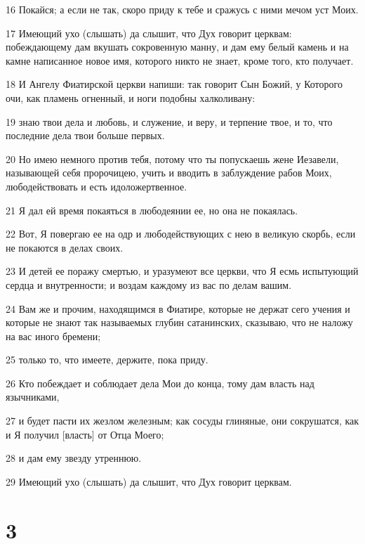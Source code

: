 \par 16 Покайся; а если не так, скоро приду к тебе и сражусь с ними мечом уст Моих.
\par 17 Имеющий ухо (слышать) да слышит, что Дух говорит церквам: побеждающему дам вкушать сокровенную манну, и дам ему белый камень и на камне написанное новое имя, которого никто не знает, кроме того, кто получает.
\par 18 И Ангелу Фиатирской церкви напиши: так говорит Сын Божий, у Которого очи, как пламень огненный, и ноги подобны халколивану:
\par 19 знаю твои дела и любовь, и служение, и веру, и терпение твое, и то, что последние дела твои больше первых.
\par 20 Но имею немного против тебя, потому что ты попускаешь жене Иезавели, называющей себя пророчицею, учить и вводить в заблуждение рабов Моих, любодействовать и есть идоложертвенное.
\par 21 Я дал ей время покаяться в любодеянии ее, но она не покаялась.
\par 22 Вот, Я повергаю ее на одр и любодействующих с нею в великую скорбь, если не покаются в делах своих.
\par 23 И детей ее поражу смертью, и уразумеют все церкви, что Я есмь испытующий сердца и внутренности; и воздам каждому из вас по делам вашим.
\par 24 Вам же и прочим, находящимся в Фиатире, которые не держат сего учения и которые не знают так называемых глубин сатанинских, сказываю, что не наложу на вас иного бремени;
\par 25 только то, что имеете, держите, пока приду.
\par 26 Кто побеждает и соблюдает дела Мои до конца, тому дам власть над язычниками,
\par 27 и будет пасти их жезлом железным; как сосуды глиняные, они сокрушатся, как и Я получил [власть] от Отца Моего;
\par 28 и дам ему звезду утреннюю.
\par 29 Имеющий ухо (слышать) да слышит, что Дух говорит церквам.

\chapter{3}

